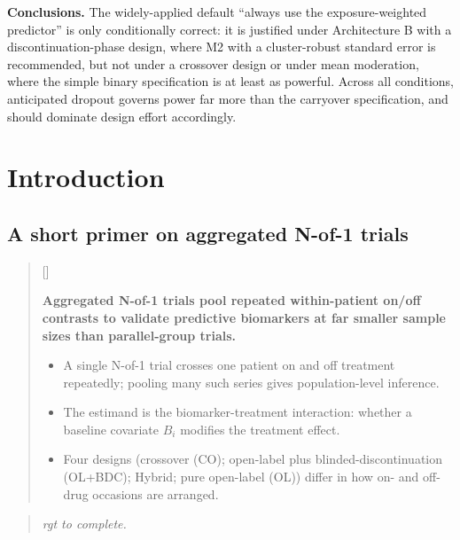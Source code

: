 \documentclass[
  11pt,
]{article}
\newcounter{pgraph}
\newenvironment{bullets}{%
  \stepcounter{pgraph}%
  \begin{quote}\small\sffamily\color[gray]{0.30}%
  {\normalfont\scriptsize\color[gray]{0.58}[\thepgraph]\enspace}}{%
  \end{quote}}
\newenvironment{rgt}{%
  \begin{quote}\small\itshape\color[RGB]{20,60,160}}{%
  \end{quote}}
\begin{document}
\textbf{Conclusions.} The widely-applied default ``always use the
exposure-weighted predictor'' is only conditionally correct: it is
justified under Architecture B with a discontinuation-phase design,
where M2 with a cluster-robust standard error is recommended, but
not under a crossover design or under mean moderation, where the
simple binary specification is at least as powerful. Across all
conditions, anticipated dropout governs power far more than the
carryover specification, and should dominate design effort
accordingly.

\section{Introduction}\label{introduction}

\subsection{A short primer on aggregated N-of-1 trials}\label{a-short-primer-on-aggregated-n-of-1-trials}

\begin{bullets}

\textbf{Aggregated N-of-1 trials pool repeated within-patient
on/off contrasts to validate predictive biomarkers at far smaller
sample sizes than parallel-group trials.}

\begin{itemize}\setlength{\itemsep}{2pt}\setlength{\parskip}{0pt}
\item A single N-of-1 trial crosses one patient on and off treatment
repeatedly; pooling many such series gives population-level
inference.
\item The estimand is the biomarker-treatment interaction:
whether a baseline covariate $B_i$ modifies the treatment effect.
\item Four designs (crossover (CO); open-label plus
blinded-discontinuation (OL+BDC); Hybrid; pure open-label (OL))
differ in how on- and off-drug occasions are arranged.
\end{itemize}

\end{bullets}

\begin{rgt}
rgt to complete.

\end{rgt}
\end{document}
